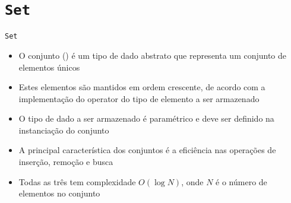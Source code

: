 \section{\texttt{Set}}

\begin{frame}[fragile]{\texttt{Set}}

    \begin{itemize}
        \item O conjunto () é um tipo de dado abstrato que representa um conjunto
            de elementos únicos

        \item Estes elementos são mantidos em ordem crescente, de acordo com a implementação
            do operator  do tipo de elemento a ser armazenado

        \item O tipo de dado a ser armazenado é paramétrico e deve ser definido na instanciação
            do conjunto

        \item A principal característica dos conjuntos é a eficiência nas operações de inserção,
            remoção e busca

        \item Todas as três tem complexidade $O(\log N)$, onde $N$ é o número de elementos no conjunto
    \end{itemize}

\end{frame}

